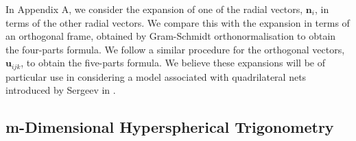 \documentclass[fleqn,11pt,twoside]{article}
\theoremstyle{definition}
\begin{document}


In Appendix A, we consider the expansion of one of the radial vectors, $\mathbf{n}_i$, in terms of the other radial vectors. We compare this with the expansion in terms of an orthogonal frame, obtained by Gram-Schmidt orthonormalisation to obtain the four-parts formula. We follow a similar procedure for the orthogonal vectors, $\mathbf{u}_{ijk}$, to obtain the five-parts formula. We believe these expansions will be of particular use in considering a model associated with quadrilateral nets introduced by Sergeev in \cite{Sergeev}. 

\subsection{m-Dimensional Hyperspherical Trigonometry}
\end{document}
